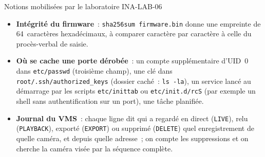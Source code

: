 \begin{boiteRemarque}{Notions mobilisées par le laboratoire INA-LAB-06}
\begin{itemize}
    \item \textbf{Intégrité du firmware}~: \texttt{sha256sum firmware.bin}
          donne une empreinte de 64~caractères hexadécimaux, à comparer
          caractère par caractère à celle du procès-verbal de saisie.
    \item \textbf{Où se cache une porte dérobée}~: un compte supplémentaire
          d'UID~0 dans \texttt{etc/passwd} (troisième champ), une clé dans
          \texttt{root/.ssh/authorized\_keys} (dossier caché~:
          \texttt{ls -la}), un service lancé au démarrage par les scripts
          \texttt{etc/inittab} ou \texttt{etc/init.d/rcS} (par exemple un
          shell sans authentification sur un port), une tâche planifiée.
    \item \textbf{Journal du VMS}~: chaque ligne dit qui a regardé en
          direct (\texttt{LIVE}), relu (\texttt{PLAYBACK}), exporté
          (\texttt{EXPORT}) ou supprimé (\texttt{DELETE}) quel enregistrement
          de quelle caméra, et depuis quelle adresse~; on compte les suppressions et on cherche la
          caméra visée par la séquence complète.
\end{itemize}
\end{boiteRemarque}

